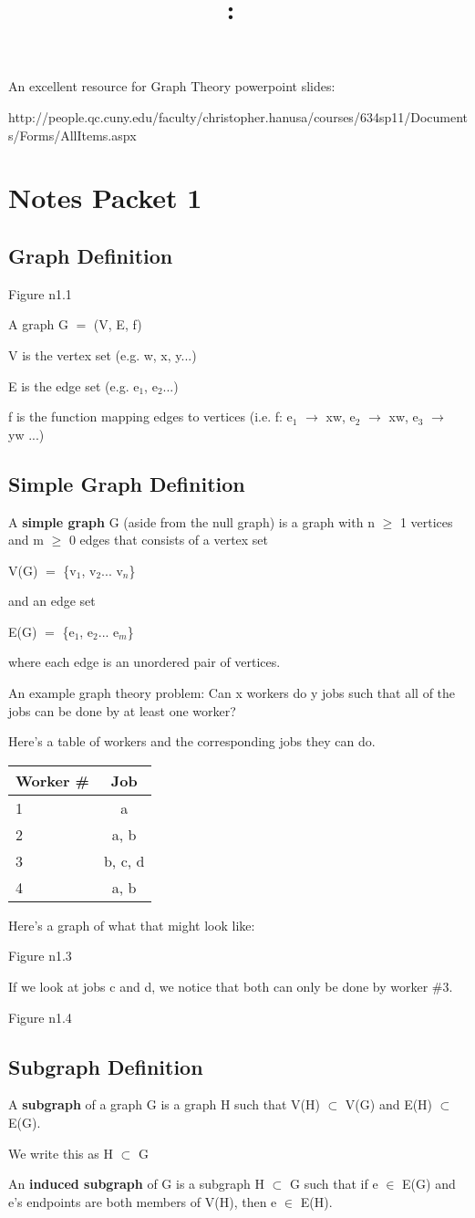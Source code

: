 \documentclass{article}
\title{
    \vspace{2in}
    \textmd{\textbf{\hmwkClass:\ \hmwkTitle}}\\
    \normalsize\vspace{0.1in}\small\vspace{0.1in}\large{\textit{\hmwkClassInstructor}}
    \vspace{3in}
}
\author{\hmwkAuthorName}
\date{}
\newcommand{\mt}[1]{\ensuremath{#1}}
\newcommand\bsc[2][\DefaultOpt]{%
  \def\DefaultOpt{#2}%
  \section[#1]{#2}%
}
\newcommand\ssc[2][\DefaultOpt]{%
  \def\DefaultOpt{#2}%
  \subsection[#1]{#2}%
}
\newcommand{\mem}{\mt{\in} }
\newcommand{\sbs}{\mt{\subset} }         %
\newcommand{\lra}{ \mt{\longrightarrow} } %
\newcommand{\bk}[1]{\{#1\}}
\newcommand{\gre}{\mt{\operatorname{\geq}} }
\newcommand{\eql}{ \mt{\operatorname{=}} }
\newcommand{\uw}[2]{#1\mt{_{#2}}}
\begin{document}
An excellent resource for Graph Theory powerpoint slides:

http://people.qc.cuny.edu/faculty/christopher.hanusa/courses/634sp11/Documents/Forms/AllItems.aspx

\bsc{Notes Packet 1}{

\ssc{Graph Definition} {
Figure n1.1

A graph G \eql (V, E, f)

V is the vertex set (e.g. w, x, y...)

E is the edge set (e.g. \uw{e}{1}, \uw{e}{2}...)

f is the function mapping edges to vertices (i.e. f: \uw{e}{1} \lra xw, \uw{e}{2} \lra xw, \uw{e}{3} \lra yw ...)
}
\ssc{Simple Graph Definition}{
A \textbf{simple graph} G (aside from the null graph) is a graph with n \gre 1 vertices and m \gre 0 edges that consists of a vertex set

V(G) \eql \bk{\uw{v}{1}, \uw{v}{2}... \uw{v}{n}}

and an edge set

E(G) \eql \bk{\uw{e}{1}, \uw{e}{2}... \uw{e}{m}}

where each edge is an unordered pair of vertices.
}

An example graph theory problem: Can x workers do y jobs such that all of the jobs can be done by at least one worker?

Here's a table of workers and the corresponding jobs they can do.

\begin{tabular}{l|c}
  Worker \# & Job \\
  \hline
  1 & a\\
  2 & a, b\\
  3 & b, c, d\\
  4 & a, b
\end{tabular}

Here's a graph of what that might look like:

Figure n1.3

If we look at jobs c and d, we notice that both can only be done by worker \#3.

Figure n1.4

\ssc{Subgraph Definition}{

A \textbf{subgraph} of a graph G is a graph H such that V(H) \sbs V(G) and E(H) \sbs E(G).

We write this as H \sbs G

An \textbf{induced subgraph} of G is a subgraph H \sbs G such that if e \mem E(G) and e's endpoints are both members of V(H), then e \mem E(H).

}
}
\end{document}
